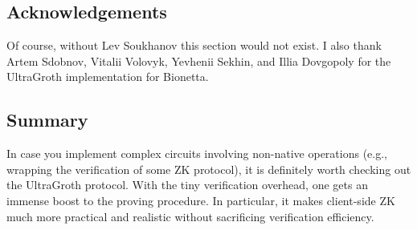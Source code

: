 \documentclass[../../book]{subfiles}
\begin{document}
\subsection{Acknowledgements}

Of course, without Lev Soukhanov this section would not exist. I also thank
Artem Sdobnov, Vitalii Volovyk, Yevhenii Sekhin, and Illia Dovgopoly for the
UltraGroth implementation for Bionetta.

\subsection{Summary}

In case you implement complex circuits involving non-native operations (e.g.,
wrapping the verification of some ZK protocol), it is definitely worth checking
out the UltraGroth protocol. With the tiny verification overhead, one gets an
immense boost to the proving procedure. In particular, it makes client-side ZK
much more practical and realistic without sacrificing verification efficiency.
\end{document}
